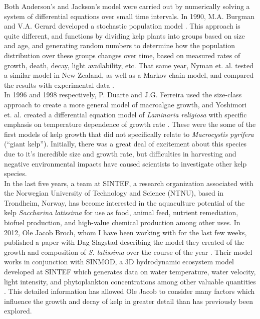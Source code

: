 \documentclass{article}
\begin{document}
Both Anderson's and Jackson's model were carried out by numerically solving a system of differential equations over small time intervals.
In 1990, M.A. Burgman and V.A. Gerard developed a stochastic population model \citep{burgman_stage-structured_1990}.
This approach is quite different, and functions by dividing kelp plants into groups based on size and age, and generating random numbers to determine how the population distribution over these groups changes over time, based on measured rates of growth, death, decay, light availability, etc.
That same year, Nyman et. al. tested a similar model in New Zealand, as well as a Markov chain model, and compared the results with experimental data \citep{nyman_macrocystis_1990}. \\[-0.75em]

In 1996 and 1998 respectively, P. Duarte and J.G. Ferreira used the size-class approach to create a more general model of macroalgae growth, and Yoshimori et. al. created a differential equation model of \textit{Laminaria religiosa} with specific emphasis on temperature dependence of growth rate \citep{duarte_model_1996,yoshimori_mathematical_1998}.
These were the some of the first models of kelp growth that did not specifically relate to \textit{Macrocystis pyrifera} (``giant kelp''). 
Initially, there was a great deal of excitement about this species due to it's incredible size and growth rate, but difficulties in harvesting and negative environmental impacts have caused scientists to investigate other kelp species. \\[-0.75em]

In the last five years, a team at SINTEF, a research organization associated with the Norwegian University of Technology and Science (NTNU), based in Trondheim, Norway, has become interested in the aquaculture potential of the kelp \textit{Saccharina latissima} for use as food, animal feed, nutrient remediation, biofuel production, and high-value chemical production among other uses. 
In 2012, Ole Jacob Broch, whom I have been working with for the last few weeks, published a paper with Dag Slagstad describing the model they created of the growth and composition of \textit{S. latissima} over the course of the year \citep{broch_modelling_2012}.
Their model works in conjunction with SINMOD, a 3D hydrodynamic ecosystem model developed at SINTEF which generates data on water temperature, water velocity, light intensity, and phytoplankton concentrations among other valuable quantities \citep{wassmann_modelling_2006}.
This detailed information has allowed Ole Jacob to consider many factors which influence the growth and decay of kelp in greater detail than has previously been explored. \\[-0.75em]
\end{document}
